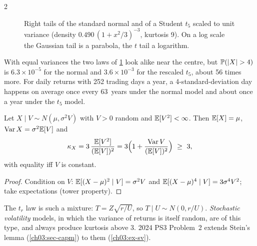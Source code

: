 \begin{paracol}{2}
\begin{figure}[ht]
\centering
{}
\caption{Right tails of the standard normal and of a Student $t_5$ scaled to unit variance (density
$0.490\,(1+x^2/3)^{-3}$, kurtosis 9). On a log scale the Gaussian tail is a parabola, the $t$ tail a
logarithm.}\label{ch03:fig-tails}
\end{figure}

With equal variances the two laws of \cref{ch03:fig-tails} look alike near the centre, but
$\Prob(|X|>4)$ is $6.3\times10^{-5}$ for the normal and $3.6\times10^{-3}$ for the rescaled $t_5$, about 56 times more.
For daily returns with 252 trading days a year, a 4-standard-deviation day happens on average once every
63~years under the normal model and about once a year under the $t_5$ model.

\begin{proposition}\label{ch03:prop-mixture}
Let $X\mid V\sim N(\mu,\sigma^2V)$ with $V>0$ random and $\mathbb{E}[V^2]<\infty$. Then $\mathbb{E}[X]=\mu$, $\operatorname{Var} X=\sigma^2\mathbb{E}[V]$ and
\[
  \kappa_X=3\,\frac{\mathbb{E}[V^2]}{(\mathbb{E}[V])^2}=3\Bigl(1+\frac{\operatorname{Var} V}{(\mathbb{E}[V])^2}\Bigr)\ \ge\ 3,
\]
with equality iff $V$ is constant.
\end{proposition}
\begin{proof}
Condition on $V$: $\mathbb{E}[(X-\mu)^2\mid V]=\sigma^2V$ and $\mathbb{E}[(X-\mu)^4\mid V]=3\sigma^4V^2$; take expectations (tower property).
\end{proof}
The $t_r$ law is such a mixture: $T=Z\sqrt{r/U}$, so $T\mid U\sim N(0,r/U)$. \emph{Stochastic volatility} models, in
which the variance of returns is itself random, are of this type, and always produce kurtosis above 3. 2024
PS3 Problem~2 extends Stein's lemma (\cref{ch03:sec-capm}) to them (\cref{ch03:ex-sv}).


\end{paracol}

